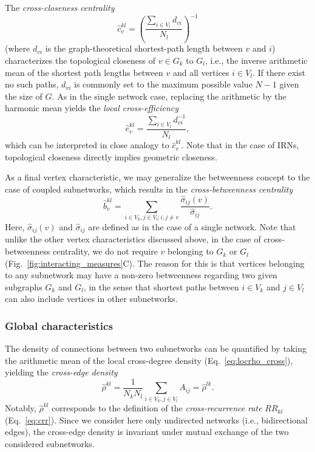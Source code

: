 The \textit{cross-closeness centrality}
\begin{equation}
\hat{c}_v^{kl} = \left(\frac{\sum_{i \in V_l} d_{vi}}{N_l}\right)^{-1}
\label{eq:closeness_cross}
\end{equation}
\noindent
(where $d_{vi}$ is the graph-theoretical shortest-path length between $v$ and $i$) characterizes the topological closeness of $v\in G_k$ to $G_l$, i.e., the inverse arithmetic mean of the shortest path lengths between $v$ and all vertices $i\in V_l$. If there exist no such paths, $d_{vi}$ is commonly set to the maximum possible value $N-1$ given the size of $G$. As in the single network case, replacing the arithmetic by the harmonic mean yields the \textit{local cross-efficiency}
\begin{equation}
\hat{e}_v^{kl} = \frac{\sum_{i \in V_l} d_{vi}^{-1}}{N_l},
\label{eq:locefficiency_cross}
\end{equation}
\noindent
which can be interpreted in close analogy to $\hat{c}_v^{kl}$. Note that in the case of IRNs, topological closeness directly implies geometric closeness.

As a final vertex characteristic, we may generalize the betweenness concept to the case of coupled subnetworks, which results in the \textit{cross-betweenness centrality}
\begin{equation}
\hat{b}_v^{kl} = \sum_{i\in V_k,j\in V_l;i,j\neq v} \frac{\hat{\sigma}_{ij}(v)}{\hat{\sigma}_{ij}}.
\label{eq:betweenness_cross}
\end{equation}
\noindent
Here, $\hat{\sigma}_{ij}(v)$ and $\hat{\sigma}_{ij}$ are defined as in the case of a single network. Note that unlike the other vertex characteristics discussed above, in the case of cross-betweenness centrality, we do not require $v$ belonging to $G_k$ or $G_l$  (Fig.~\ref{fig:interacting_measures}C). The reason for this is that vertices belonging to any subnetwork may have a non-zero betweenness regarding two given subgraphs $G_k$ and $G_l$, in the sense that shortest paths between $i\in V_k$ and $j\in V_l$ can also include vertices in other subnetworks. 


\subsubsection{Global characteristics}

The density of connections between two subnetworks can be quantified by taking the arithmetic mean of the local cross-degree density (Eq.~\ref{eq:locrho_cross}), yielding the \textit{cross-edge density}
\begin{equation}
\hat{\rho}^{kl} = \frac{1}{N_k N_l} \sum_{i \in V_k, j \in V_l} A_{ij} = \hat{\rho}^{lk}.
\label{eq:globrho_cross}
\end{equation}
Notably, $\hat{\rho}^{kl}$ corresponds to the definition of the \textit{cross-recurrence rate} $RR_{kl}$ (Eq.~\ref{eq:crr}). Since we consider here only undirected networks (i.e., bidirectional edges), the cross-edge density is invariant under mutual exchange of the two considered subnetworks.

